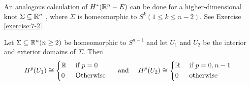 An analogous calculation of $H^*(\mathbb{R}^n - E)$ can be done for a higher-dimensional
knot $\Sigma\subseteq\mathbb{R}^n$ , where $\Sigma$ is homeomorphic to $S^k(1\le k\le n-2)$. 
See Exercise \ref{exercise:7-2}.


\begin{proposition}\label{proposition:7-16}
  Let $\Sigma\subseteq\mathbb{R}^n (n\ge 2)$ be homeomorphic to $S^{n-1}$ and let $U_1$ and $U_2$ be the 
  interior and exterior domains of $\Sigma$. Then 
  \begin{align*}
    H^p(U_1) \cong \left\{\begin{aligned}
      & \mathbb{R} && \text{ if } p = 0 \\
      & 0 && \text{ Otherwise }
    \end{aligned}\right.
    && \text{ and } && 
    H^p(U_2) \cong \left\{\begin{aligned}
      & \mathbb{R} && \text{ if } p = 0, n-1 \\
      & 0 && \text{ otherwise }
    \end{aligned}\right.
  \end{align*}
\end{proposition}

